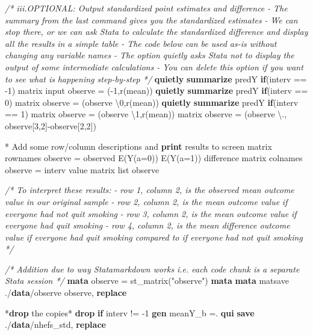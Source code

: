 \documentclass[
  10pt,
]{book}
\newenvironment{Shaded}{\begin{snugshade}}{\end{snugshade}}
\newcommand{\CommentTok}[1]{\textcolor[rgb]{0.56,0.35,0.01}{\textit{#1}}}
\newcommand{\FunctionTok}[1]{\textcolor[rgb]{0.00,0.00,0.00}{#1}}
\newcommand{\KeywordTok}[1]{\textcolor[rgb]{0.13,0.29,0.53}{\textbf{#1}}}
\newcommand{\NormalTok}[1]{#1}
\newcommand{\OtherTok}[1]{\textcolor[rgb]{0.56,0.35,0.01}{#1}}
\newcommand{\StringTok}[1]{\textcolor[rgb]{0.31,0.60,0.02}{#1}}
\begin{document}
\begin{Shaded}
\begin{Highlighting}[]
\CommentTok{/* iii.OPTIONAL: Output standardized point estimates and difference}
\CommentTok{{-} The summary from the last command gives you the }
\CommentTok{standardized estimates}
\CommentTok{{-} We can stop there, or we can ask Stata to calculate the }
\CommentTok{standardized difference and display all the results }
\CommentTok{in a simple table}
\CommentTok{{-} The code below can be used as{-}is without changing any}
\CommentTok{variable names}
\CommentTok{{-} The option \textasciigrave{}quietly\textasciigrave{} asks Stata not to display the output of }
\CommentTok{some intermediate calculations}
\CommentTok{{-} You can delete this option if you want to see what is }
\CommentTok{happening step{-}by{-}step */}
\KeywordTok{quietly} \KeywordTok{summarize}\NormalTok{ predY }\KeywordTok{if}\NormalTok{(interv == {-}1)}
\FunctionTok{matrix}\NormalTok{ input observe = ({-}1,}\OtherTok{\textasciigrave{}r(mean)\textquotesingle{}}\NormalTok{)}
\KeywordTok{quietly} \KeywordTok{summarize}\NormalTok{ predY }\KeywordTok{if}\NormalTok{(interv == 0)}
\FunctionTok{matrix}\NormalTok{ observe = (observe \textbackslash{}0,}\OtherTok{\textasciigrave{}r(mean)\textquotesingle{}}\NormalTok{)}
\KeywordTok{quietly} \KeywordTok{summarize}\NormalTok{ predY }\KeywordTok{if}\NormalTok{(interv == 1)}
\FunctionTok{matrix}\NormalTok{ observe = (observe \textbackslash{}1,}\OtherTok{\textasciigrave{}r(mean)\textquotesingle{}}\NormalTok{)}
\FunctionTok{matrix}\NormalTok{ observe = (observe \textbackslash{}., observe[3,2]{-}observe[2,2]) }

\NormalTok{* Add some }\OtherTok{row}\NormalTok{/column descriptions and }\KeywordTok{print}\NormalTok{ results to screen}
\FunctionTok{matrix} \OtherTok{rownames}\NormalTok{ observe = observed E(Y(a=0)) E(Y(a=1)) difference}
\FunctionTok{matrix} \OtherTok{colnames}\NormalTok{ observe = interv }\OtherTok{value}
\FunctionTok{matrix} \OtherTok{list}\NormalTok{ observe }

\CommentTok{/* To interpret these results:}
\CommentTok{{-} row 1, column 2, is the observed mean outcome value }
\CommentTok{in our original sample}
\CommentTok{{-} row 2, column 2, is the mean outcome value }
\CommentTok{if everyone had not quit smoking}
\CommentTok{{-} row 3, column 2, is the mean outcome value }
\CommentTok{if everyone had quit smoking}
\CommentTok{{-} row 4, column 2, is the mean difference outcome value }
\CommentTok{if everyone had quit smoking compared to if everyone }
\CommentTok{had not quit smoking */}

\CommentTok{/* Addition due to way Statamarkdown works }
\CommentTok{i.e. each code chunk is a separate Stata session */}
\KeywordTok{mata}\NormalTok{ observe = st\_matrix(}\StringTok{"observe"}\NormalTok{)}
\KeywordTok{mata} \KeywordTok{mata}\NormalTok{ matsave ./}\KeywordTok{data}\NormalTok{/observe observe, }\KeywordTok{replace}

\NormalTok{*}\KeywordTok{drop}\NormalTok{ the copies*}
\KeywordTok{drop} \KeywordTok{if}\NormalTok{ interv != {-}1}
\KeywordTok{gen}\NormalTok{ meanY\_b =.}
\KeywordTok{qui} \KeywordTok{save}\NormalTok{ ./}\KeywordTok{data}\NormalTok{/nhefs\_std, }\KeywordTok{replace}
\end{Highlighting}
\end{Shaded}
\end{document}
